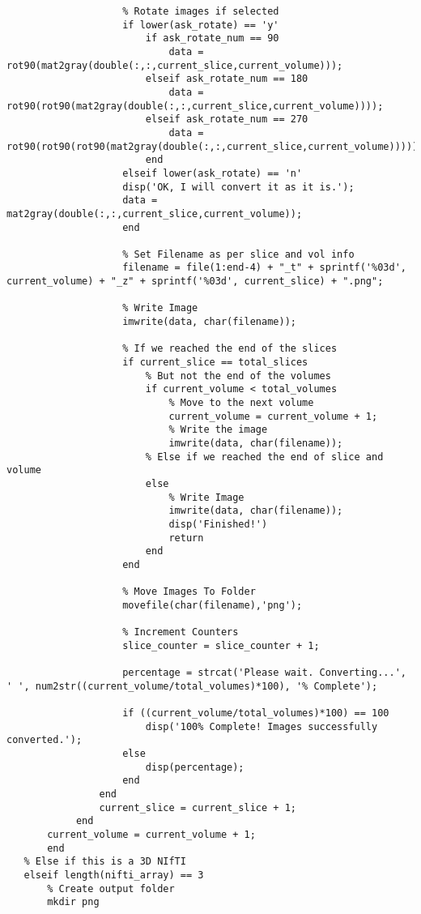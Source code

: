 \begin{appendices}
\begin{lstlisting}
                    % Rotate images if selected
                    if lower(ask_rotate) == 'y'
                        if ask_rotate_num == 90
                            data = rot90(mat2gray(double(:,:,current_slice,current_volume)));
                        elseif ask_rotate_num == 180
                            data = rot90(rot90(mat2gray(double(:,:,current_slice,current_volume))));
                        elseif ask_rotate_num == 270
                            data = rot90(rot90(rot90(mat2gray(double(:,:,current_slice,current_volume)))));
                        end
                    elseif lower(ask_rotate) == 'n'
                    disp('OK, I will convert it as it is.');
                    data = mat2gray(double(:,:,current_slice,current_volume));
                    end

                    % Set Filename as per slice and vol info
                    filename = file(1:end-4) + "_t" + sprintf('%03d', current_volume) + "_z" + sprintf('%03d', current_slice) + ".png";

                    % Write Image
                    imwrite(data, char(filename));

                    % If we reached the end of the slices
                    if current_slice == total_slices
                        % But not the end of the volumes
                        if current_volume < total_volumes
                            % Move to the next volume
                            current_volume = current_volume + 1;
                            % Write the image
                            imwrite(data, char(filename));
                        % Else if we reached the end of slice and volume
                        else
                            % Write Image
                            imwrite(data, char(filename));
                            disp('Finished!')
                            return
                        end
                    end

                    % Move Images To Folder
                    movefile(char(filename),'png');

                    % Increment Counters
                    slice_counter = slice_counter + 1;

                    percentage = strcat('Please wait. Converting...', ' ', num2str((current_volume/total_volumes)*100), '% Complete');

                    if ((current_volume/total_volumes)*100) == 100
                        disp('100% Complete! Images successfully converted.');
                    else
                        disp(percentage);
                    end
                end
                current_slice = current_slice + 1;
            end
       current_volume = current_volume + 1;
       end
   % Else if this is a 3D NIfTI
   elseif length(nifti_array) == 3
       % Create output folder
       mkdir png


\end{lstlisting}
\end{appendices}
